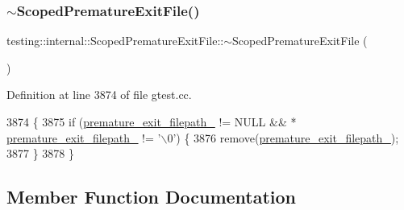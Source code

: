 \subsubsection{\texorpdfstring{$\sim$\+Scoped\+Premature\+Exit\+File()}{~ScopedPrematureExitFile()}}
{\footnotesize\ttfamily testing\+::internal\+::\+Scoped\+Premature\+Exit\+File\+::$\sim$\+Scoped\+Premature\+Exit\+File (\begin{DoxyParamCaption}{ }\end{DoxyParamCaption})\hspace{0.3cm}{\ttfamily [inline]}}



Definition at line 3874 of file gtest.\+cc.


\begin{DoxyCode}
3874                              \{
3875     \textcolor{keywordflow}{if} (\hyperlink{classtesting_1_1internal_1_1ScopedPrematureExitFile_a41f573a197749afb0a2b14b289f7aa62}{premature\_exit\_filepath\_} != NULL && *
      \hyperlink{classtesting_1_1internal_1_1ScopedPrematureExitFile_a41f573a197749afb0a2b14b289f7aa62}{premature\_exit\_filepath\_} != \textcolor{charliteral}{'\(\backslash\)0'}) \{
3876       \textcolor{keyword}{remove}(\hyperlink{classtesting_1_1internal_1_1ScopedPrematureExitFile_a41f573a197749afb0a2b14b289f7aa62}{premature\_exit\_filepath\_});
3877     \}
3878   \}
\end{DoxyCode}


\subsection{Member Function Documentation}
\mbox{\label{classtesting_1_1internal_1_1ScopedPrematureExitFile_a4c7a2d9d5a94035756b97b5c1e0c2597}} 
